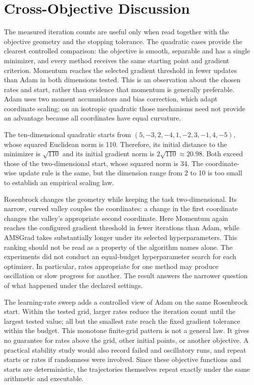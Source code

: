 ﻿\documentclass[conference]{IEEEtran}
\begin{document}
\section{Cross-Objective Discussion}
The measured iteration counts are useful only when read together with the objective geometry and the stopping tolerance. The quadratic cases provide the clearest controlled comparison: the objective is smooth, separable and has a single minimizer, and every method receives the same starting point and gradient criterion. Momentum reaches the selected gradient threshold in fewer updates than Adam in both dimensions tested. This is an observation about the chosen rates and start, rather than evidence that momentum is generally preferable. Adam uses two moment accumulators and bias correction, which adapt coordinate scaling; on an isotropic quadratic those mechanisms need not provide an advantage because all coordinates have equal curvature.

The ten-dimensional quadratic starts from $(5,-3,2,-4,1,-2,3,-1,4,-5)$, whose squared Euclidean norm is 110. Therefore, its initial distance to the minimizer is $\sqrt{110}$ and its initial gradient norm is $2\sqrt{110}\approx20.98$. Both exceed those of the two-dimensional start, whose squared norm is 34. The coordinate-wise update rule is the same, but the dimension range from 2 to 10 is too small to establish an empirical scaling law.

Rosenbrock changes the geometry while keeping the task two-dimensional. Its narrow, curved valley couples the coordinates: a change in the first coordinate changes the valley's appropriate second coordinate. Here Momentum again reaches the configured gradient threshold in fewer iterations than Adam, while AMSGrad takes substantially longer under its selected hyperparameters. This ranking should not be read as a property of the algorithm names alone. The experiments did not conduct an equal-budget hyperparameter search for each optimizer. In particular, rates appropriate for one method may produce oscillation or slow progress for another. The result answers the narrower question of what happened under the declared settings.

The learning-rate sweep adds a controlled view of Adam on the same Rosenbrock start. Within the tested grid, larger rates reduce the iteration count until the largest tested value; all but the smallest rate reach the fixed gradient tolerance within the budget. This monotone finite-grid pattern is not a general law. It gives no guarantee for rates above the grid, other initial points, or another objective. A practical stability study would also record failed and oscillatory runs, and repeat starts or rates if randomness were involved. Since these objective functions and starts are deterministic, the trajectories themselves repeat exactly under the same arithmetic and executable.
\end{document}
